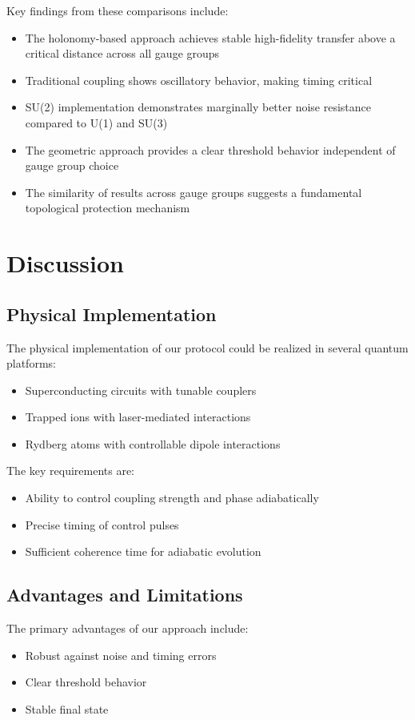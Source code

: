 \documentclass[12pt]{article}
\begin{document}
Key findings from these comparisons include:
\begin{itemize}
\item The holonomy-based approach achieves stable high-fidelity transfer above a critical distance across all gauge groups
\item Traditional coupling shows oscillatory behavior, making timing critical
\item SU(2) implementation demonstrates marginally better noise resistance compared to U(1) and SU(3)
\item The geometric approach provides a clear threshold behavior independent of gauge group choice
\item The similarity of results across gauge groups suggests a fundamental topological protection mechanism
\end{itemize}

\section{Discussion}
\subsection{Physical Implementation}
The physical implementation of our protocol could be realized in several quantum platforms:
\begin{itemize}
\item Superconducting circuits with tunable couplers
\item Trapped ions with laser-mediated interactions
\item Rydberg atoms with controllable dipole interactions
\end{itemize}

The key requirements are:
\begin{itemize}
\item Ability to control coupling strength and phase adiabatically
\item Precise timing of control pulses
\item Sufficient coherence time for adiabatic evolution
\end{itemize}

\subsection{Advantages and Limitations}
The primary advantages of our approach include:
\begin{itemize}
\item Robust against noise and timing errors
\item Clear threshold behavior
\item Stable final state
\end{itemize}
\end{document}
